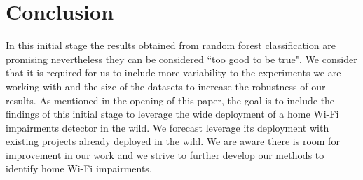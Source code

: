 \section{Conclusion}\label{Results}



In this initial stage the results obtained from random forest classification are promising nevertheless they can be considered ``too good to be true". We consider that it is required for us to include more variability to the experiments we are working with and the size of the datasets to increase the robustness of our results. As mentioned in the opening of this paper, the goal is to include the findings of this initial stage to leverage the wide deployment of a home Wi-Fi impairments detector in the wild. We forecast leverage its deployment with existing projects already deployed in the wild. We are aware there is room for improvement in our work and we strive to further develop our methods to identify home Wi-Fi impairments.


\newpage


